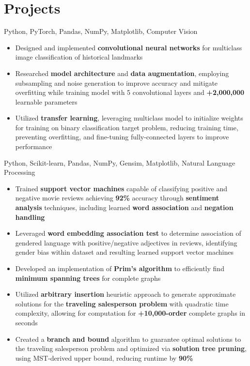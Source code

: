 \documentclass[letterpaper,11pt]{article}
\begin{document}
\section{Projects}
{Python, PyTorch, Pandas, NumPy, Matplotlib, Computer Vision}{}
\begin{itemize}
    \item Designed and implemented \textbf{convolutional neural networks} for multiclass
          image classification of historical landmarks
    \item Researched \textbf{model architecture} and \textbf{data augmentation},
          employing subsampling and noise generation to improve accuracy and mitigate
          overfitting while training model with 5 convolutional layers and
          \textbf{+2,000,000} learnable parameters
    \item Utilized \textbf{transfer learning}, leveraging multiclass model to initialize
          weights for training on binary classification target problem, reducing training
          time, preventing overfitting, and fine-tuning fully-connected layers to improve
          performance
\end{itemize}
{Python, Scikit-learn, Pandas, NumPy, Gensim, Matplotlib, Natural Language Processing}{}
\begin{itemize}
    \item Trained \textbf{support vector machines} capable of classifying positive and
          negative movie reviews achieving \textbf{92\%} accuracy through
          \textbf{sentiment analysis} techniques, including learned \textbf{word
              association} and \textbf{negation handling}
    \item Leveraged \textbf{word embedding association test} to determine association of
          gendered language with positive/negative adjectives in reviews, identifying
          gender bias within dataset and resulting learned support vector machines
\end{itemize}
\begin{itemize}
    \item Developed an implementation of \textbf{Prim's algorithm} to efficiently find
          \textbf{minimum spanning trees} for complete graphs
    \item Utilized \textbf{arbitrary insertion} heuristic approach to generate
          approximate solutions for the \textbf{traveling salesperson problem} with
          quadratic time complexity, allowing for computation for \textbf{+10,000-order}
          complete graphs in seconds
    \item Created a \textbf{branch and bound} algorithm to guarantee optimal solutions to
          the traveling salesperson problem and optimized via \textbf{solution tree
              pruning}, using MST-derived upper bound, reducing runtime by \textbf{90\%}
\end{itemize}
\end{document}

